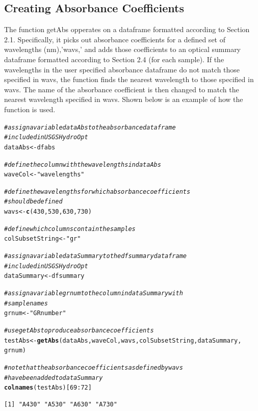 \documentclass[a4paper,11pt]{article}\usepackage[]{graphicx}\usepackage[]{color}
\makeatletter
\newcommand{\hlnum}[1]{\textcolor[rgb]{0.686,0.059,0.569}{#1}}%
\newcommand{\hlstr}[1]{\textcolor[rgb]{0.192,0.494,0.8}{#1}}%
\newcommand{\hlcom}[1]{\textcolor[rgb]{0.678,0.584,0.686}{\textit{#1}}}%
\newcommand{\hlopt}[1]{\textcolor[rgb]{0,0,0}{#1}}%
\newcommand{\hlstd}[1]{\textcolor[rgb]{0.345,0.345,0.345}{#1}}%
\newcommand{\hlkwb}[1]{\textcolor[rgb]{0.69,0.353,0.396}{#1}}%
\newcommand{\hlkwd}[1]{\textcolor[rgb]{0.737,0.353,0.396}{\textbf{#1}}}%
\newenvironment{kframe}{%
 \def\at@end@of@kframe{}%
 \ifinner\ifhmode%
  \def\at@end@of@kframe{\end{minipage}}%
  \begin{minipage}{\columnwidth}%
 \fi\fi%
 \def\FrameCommand##1{\hskip\@totalleftmargin \hskip-\fboxsep
 \colorbox{shadecolor}{##1}\hskip-\fboxsep
     \hskip-\linewidth \hskip-\@totalleftmargin \hskip\columnwidth}%
 \MakeFramed {\advance\hsize-\width
   \@totalleftmargin\z@ \linewidth\hsize
   \@setminipage}}%
 {\par\unskip\endMakeFramed%
 \at@end@of@kframe}
\newenvironment{knitrout}{}{} %
\makeatother
\begin{document}
\subsection{Creating Absorbance Coefficients}
The function getAbs opperates on a dataframe formatted according to Section 2.1. Specifically, it picks out absorbance coefficients for a defined set of wavelengths (nm),'wavs,' and adds those coefficients to an optical summary dataframe formatted according to Section 2.4 (for each sample). If the wavelengths in the user specified absorbance dataframe do not match those specified in wavs, the function finds the nearest wavelength to those specified in wavs.  The name of the absorbance coefficient is then changed to match the nearest wavelength specified in wavs. Shown below is an example of how the function is used.

\begin{knitrout}
\color{fgcolor}\begin{kframe}
\begin{alltt}
\hlcom{# assign a variable dataAbs to the absorbance dataframe}
\hlcom{# included in USGSHydroOpt}
\hlstd{dataAbs} \hlkwb{<-} \hlstd{dfabs}

\hlcom{# define the column with the wavelengths in dataAbs}
\hlstd{waveCol} \hlkwb{<-} \hlstr{"wavelengths"}

\hlcom{# define the wavelengths for which absorbance coefficients}
\hlcom{# should be defined}
\hlstd{wavs} \hlkwb{<-} \hlkwd{c}\hlstd{(}\hlnum{430}\hlstd{,} \hlnum{530}\hlstd{,} \hlnum{630}\hlstd{,} \hlnum{730}\hlstd{)}

\hlcom{# define which columns contain the samples}
\hlstd{colSubsetString} \hlkwb{<-} \hlstr{"gr"}

\hlcom{# assign a variable dataSummary to the dfsummary dataframe}
\hlcom{# included in USGSHydroOpt}
\hlstd{dataSummary} \hlkwb{<-} \hlstd{dfsummary}

\hlcom{# assign a variable grnum to the column in dataSummary with}
\hlcom{# sample names}
\hlstd{grnum} \hlkwb{<-} \hlstr{"GRnumber"}

\hlcom{# use getAbs to produce absorbance coefficients}
\hlstd{testAbs} \hlkwb{<-} \hlkwd{getAbs}\hlstd{(dataAbs, waveCol, wavs, colSubsetString, dataSummary,}
    \hlstd{grnum)}

\hlcom{# note that the absorbance coefficients as defined by wavs}
\hlcom{# have been added to dataSummary}
\hlkwd{colnames}\hlstd{(testAbs)[}\hlnum{69}\hlopt{:}\hlnum{72}\hlstd{]}
\end{alltt}
\begin{verbatim}
[1] "A430" "A530" "A630" "A730"
\end{verbatim}
\end{kframe}
\end{knitrout}
\end{document}
